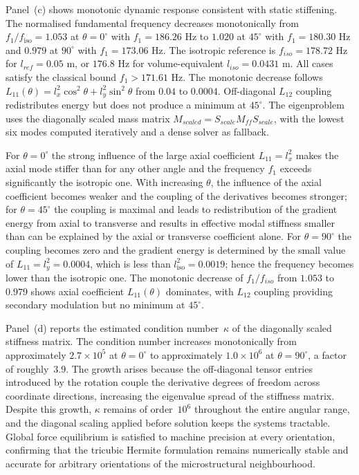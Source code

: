\documentclass[final,3p,times,fleqn]{elsarticle}
\newcommand{\revtwo}[1]{\textcolor{revtwocolor}{#1}}
\begin{document}
Panel~(c) shows monotonic dynamic response consistent with static stiffening.
The normalised fundamental frequency decreases monotonically from $f_{1}/f_{\mathrm{iso}}=1.053$ at $\theta=0^{\circ}$ with $f_1=186.26$ Hz to $1.020$ at $45^{\circ}$ with $f_1=180.30$ Hz and $0.979$ at $90^{\circ}$ with $f_1=173.06$ Hz. The isotropic reference is $f_{iso}=178.72$ Hz for $l_{ref}=0.05$ m, or $176.8$ Hz for volume-equivalent $l_{iso}=0.0431$ m. All cases satisfy the classical bound $f_1>171.61$ Hz. The monotonic decrease follows $L_{11}(\theta)=l_x^2\cos^2\theta+l_y^2\sin^2\theta$ from $0.04$ to $0.0004$. Off-diagonal $L_{12}$ coupling redistributes energy but does not produce a minimum at $45^{\circ}$. \revtwo{The eigenproblem uses the diagonally scaled mass matrix $M_{scaled}=S_{scale}M_{ff}S_{scale}$, with the lowest six modes computed iteratively and a dense solver as fallback.}

For $\theta = 0^{\circ}$ the strong influence of the large axial coefficient
$L_{11} = l_{x}^{2}$ makes the axial
mode stiffer than for any other angle and the frequency $f_{1}$ exceeds
significantly the isotropic one.
With increasing $\theta$, the influence of the axial coefficient becomes weaker and the
coupling of the derivatives becomes stronger; for $\theta = 45^{\circ}$ the coupling is maximal and
leads to redistribution of the gradient energy from axial to transverse and results in effective
modal stiffness smaller than can be explained by the axial or transverse coefficient alone.
For $\theta = 90^{\circ}$ the coupling becomes zero and the gradient energy is determined
by the small value of $L_{11} = l_{y}^{2} = 0.0004$,
which is less than $l_{\mathrm{iso}}^{2} = 0.0019$; hence the frequency becomes lower than
the isotropic one.
The monotonic decrease of $f_1/f_{iso}$ from $1.053$ to $0.979$ shows axial coefficient $L_{11}(\theta)$ dominates, with $L_{12}$ coupling providing secondary modulation but no minimum at $45^{\circ}$. 

Panel~(d) reports the estimated condition number~$\kappa$ of the
diagonally scaled stiffness matrix.
The condition number increases monotonically from approximately
$2.7\times10^{5}$ at $\theta = 0^{\circ}$ to approximately
$1.0\times10^{6}$ at $\theta = 90^{\circ}$, a factor of roughly~$3.9$.
The growth arises because the off-diagonal tensor entries introduced by
the rotation couple the derivative degrees of freedom across coordinate
directions, increasing the eigenvalue spread of the stiffness matrix.
Despite this growth, $\kappa$ remains of order~$10^{6}$ throughout the
entire angular range, and the diagonal scaling applied before solution
keeps the systems tractable.
Global force equilibrium is satisfied to machine precision at every
orientation, confirming that the tricubic Hermite formulation remains
numerically stable and accurate for arbitrary orientations of the
microstructural neighbourhood.
\end{document}
